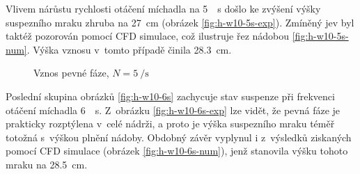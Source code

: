 Vlivem nárůstu rychlosti otáčení míchadla na \SI{5}{\per\second} došlo ke zvýšení výšky suspezního mraku zhruba na \SI{27}{\centi\meter} (obrázek \ref{fig:h-w10-5s-exp}). Zmíněný jev byl taktéž pozorován pomocí CFD simulace, což ilustruje řez nádobou \ref{fig:h-w10-5s-num}. Výška vznosu v~tomto případě činila \SI{28.3}{\centi\meter}. 
\newpage

\begin{figure}[t!]
 \centering
  \qquad 
  \caption{Vznos pevné fáze, $N=\SI{5}{\per\second}$}
  \label{fig:h-w10-5s}
\end{figure}
Poslední skupina obrázků \ref{fig:h-w10-6s} zachycuje stav suspenze při frekvenci otáčení míchadla \SI{6}{\per\second}. Z~obrázku \ref{fig:h-w10-6s-exp} lze vidět, že pevná fáze je prakticky rozptýlena v~celé nádrži, a proto je výška suspezního mraku téměř totožná s~výškou plnění nádoby. Obdobný závěr vyplynul i z~výsledků ziskaných pomocí CFD simulace (obrázek \ref{fig:h-w10-6s-num}), jenž stanovila výšku tohoto mraku na \SI{28.5}{\centi\meter}.

